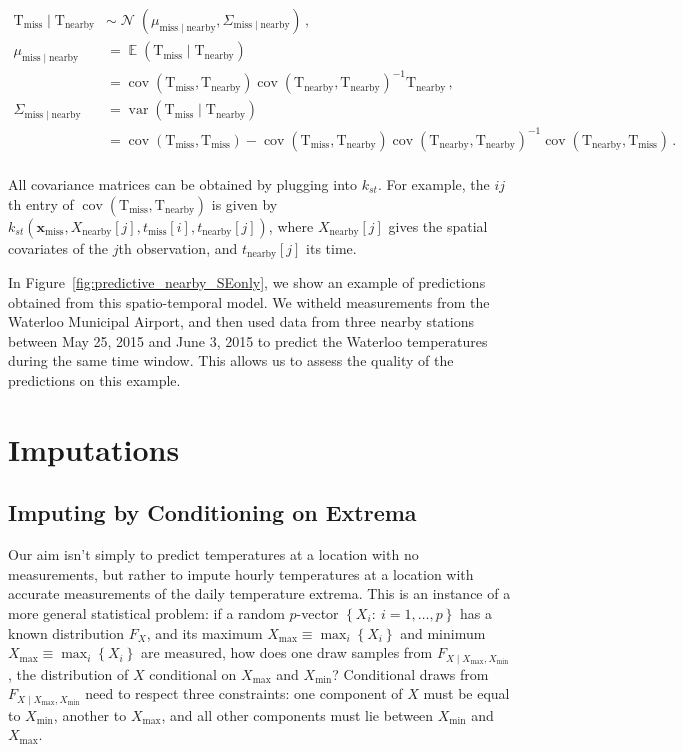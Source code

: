 \documentclass[letter]{article}
\newcommand{\genericdel}[3]{%
      \left#1#3\right#2
    }
\newcommand{\del}[1]{\genericdel(){#1}}
\newcommand{\sbr}[1]{\genericdel[]{#1}}
\newcommand{\cbr}[1]{\genericdel\{\}{#1}}
\DeclareMathOperator{\E}{\mathbb{E}}
\DeclareMathOperator{\cov}{{cov}}
\DeclareMathOperator{\var}{{var}}
\DeclareMathOperator{\normal}{\mathcal{N}}
\newcommand{\T}{\mathrm{T}}
\newcommand{\xvec}{\mathbold{x}}
\newcommand{\miss}{\mathrm{miss}}
\newcommand{\obs}{\mathrm{nearby}}
\newcommand{\Xmax}{X_{\max}}
\newcommand{\Xmin}{X_{\min}}
\newcommand{\Fcond}{F_{X \mid \Xmax,\Xmin}}
\newcommand{\eqlabel}[1]{\label{#1}}
\begin{document}
\begin{equation}
\eqlabel{eq:unconstrained_post}
\begin{split}
    \T_\miss \mid \T_\obs &\sim \normal\del{\mu_{\miss \mid \obs}, \Sigma_{\miss \mid \obs}}\,, \\
    \mu_{\miss \mid \obs} &= \E \del{\T_\miss \mid \T_\obs} \\
        &= \cov\del{\T_\miss, \T_\obs} \cov\del{\T_\obs, \T_\obs}^{-1} \T_\obs\,, \\
    \Sigma_{\miss \mid \obs} &= \var \del{\T_\miss \mid \T_\obs} \\
        &= \cov\del{\T_\miss,\T_\miss} - \cov\del{\T_\miss, \T_\obs} \cov\del{\T_\obs, \T_\obs}^{-1} \cov\del{\T_\obs, \T_\miss}\,. \\ %
\end{split}
\end{equation}

All covariance matrices can be obtained by plugging into \(k_{st}\). For example, the \(ij\)th entry of \(\cov\del{\T_\miss, \T_\obs}\) is given by \(k_{st}(\xvec_\miss,X_\obs\sbr{j},t_\miss\sbr{i},t_\obs\sbr{j})\), where \(X_\obs\sbr{j}\) gives the spatial covariates of the \(j\)th observation, and \(t_\obs\sbr{j}\) its time.

In Figure~\ref{fig:predictive_nearby_SEonly}, we show an example of predictions obtained from this spatio-temporal model. We witheld measurements from the Waterloo Municipal Airport, and then used data from three nearby stations between May 25, 2015 and June 3, 2015 to predict the Waterloo temperatures during the same time window. This allows us to assess the quality of the predictions on this example.
    


        \section{Imputations}\label{imputations}

\subsection{Imputing by Conditioning on Extrema}\label{imputing-by-conditioning-on-extrema}
    


        Our aim isn't simply to predict temperatures at a location with no measurements, but rather to impute hourly temperatures at a location with accurate measurements of the daily temperature extrema.
This is an instance of a more general statistical problem: if a random \(p\)-vector \(\cbr{X_i:~i=1,\ldots,p}\) has a known distribution \(F_X\), and its maximum \(\Xmax \equiv \max_i\cbr{X_i}\) and minimum \(\Xmax \equiv \max_i\cbr{X_i}\) are measured, how does one draw samples from \(\Fcond\), the distribution of \(X\) conditional on \(\Xmax\) and \(\Xmin\)?
Conditional draws from \(\Fcond\) need to respect three constraints: one component of \(X\) must be equal to \(\Xmin\), another to \(\Xmax\), and all other components must lie between \(\Xmin\) and \(\Xmax\).
    
\end{document}
